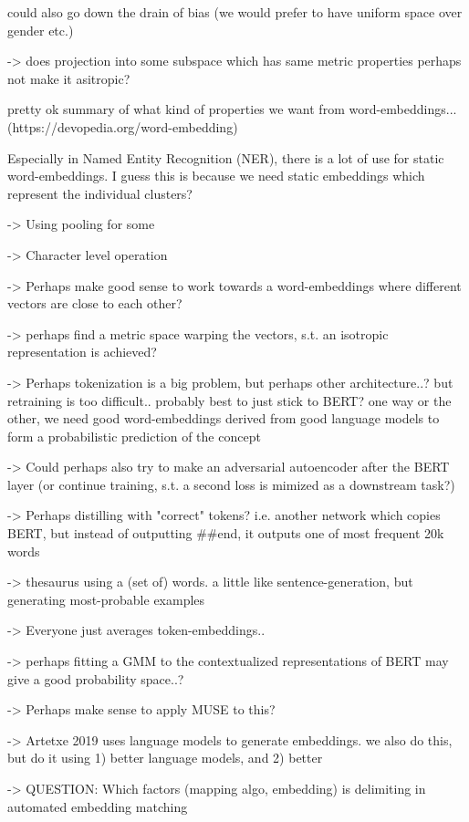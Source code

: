 \documentclass[a4paper,12pt,twoside,openright]{report}
\begin{document}
could also go down the drain of bias (we would prefer to have uniform space over gender etc.)

-> does projection into some subspace which has same metric properties perhaps not make it asitropic?

pretty ok summary of what kind of properties we want from word-embeddings... (https://devopedia.org/word-embedding)


Especially in Named Entity Recognition (NER), there is a lot of use for static word-embeddings.
I guess this is because we need static embeddings which represent the individual clusters?

-> Using pooling for some 

-> Character level operation

-> Perhaps make good sense to work towards a word-embeddings where different vectors are close to each other?

-> perhaps find a metric space warping the vectors, s.t. an isotropic representation is achieved?

-> Perhaps tokenization is a big problem, but perhaps other architecture..? but retraining is too difficult.. probably best to just stick to BERT? one way or the other, we need good word-embeddings derived from good language models to form a probabilistic prediction of the concept


-> Could perhaps also try to make an adversarial autoencoder after the BERT layer (or continue training, s.t. a second loss is mimized as a downstream task?)

-> Perhaps distilling with "correct" tokens? i.e. another network which copies BERT, but instead of outputting \#\#end, it outputs one of most frequent 20k words

-> thesaurus using a (set of) words. a little like sentence-generation, but generating most-probable examples

-> Everyone just averages token-embeddings..

-> perhaps fitting a GMM to the contextualized representations of BERT may give a good probability space..?

-> Perhaps make sense to apply MUSE to this?

-> Artetxe 2019 uses language models to generate embeddings. we also do this, but do it using 1) better language models, and 2) better 

-> QUESTION: Which factors (mapping algo, embedding) is delimiting in automated embedding matching
\end{document}
